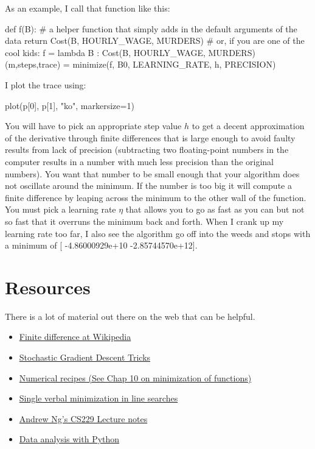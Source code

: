 \begin{fullwidth}
As an example, I call that function like this:

\begin{pyverbatim}
def f(B): # a helper function that simply adds in the default arguments of the data
    return Cost(B, HOURLY_WAGE, MURDERS)
# or, if you are one of the cool kids:
f = lambda B : Cost(B, HOURLY_WAGE, MURDERS)
(m,steps,trace) = minimize(f, B0, LEARNING_RATE, h, PRECISION)
\end{pyverbatim}

\noindent I plot the trace using:

\begin{pyverbatim}
plot(p[0], p[1], "ko", markersize=1)
\end{pyverbatim}

You will have to pick an appropriate step value $h$ to get a decent approximation of the derivative through finite differences that is large enough to avoid faulty results from lack of precision (subtracting two floating-point numbers in the computer results in a number with much less precision than the original numbers). You want that number to be small enough that your algorithm does not oscillate around the minimum. If the number is too big it will compute a finite difference by leaping across the minimum to the other wall of the function. You must pick a learning rate $\eta$ that allows you to go as fast as you can but not so fast that it overruns the minimum back and forth. When I crank up my learning rate too far, I also see the algorithm go off into the weeds and stops with a minimum of [ -4.86000929e+10  -2.85744570e+12].

\section{Resources}

There is a lot of material out there on the web that can be helpful.

\begin{itemize}
\item \href{http://en.wikipedia.org/wiki/Finite_difference}{Finite difference at Wikipedia}
\item \href{http://research.microsoft.com/pubs/192769/tricks-2012.pdf}{Stochastic Gradient Descent Tricks}
\item \href{http://apps.nrbook.com/fortran/index.html}{Numerical recipes (See Chap 10 on minimization of functions)}
\item \href{http://adl.stanford.edu/aa222/Lecture_Notes_files/AA222-Lecture2.pdf}{Single verbal minimization in line searches}
\item \href{http://cs229.stanford.edu/notes/cs229-notes1.pdf}{Andrew Ng's CS229 Lecture notes}
\item \href{http://people.duke.edu/~ccc14/pcfb/analysis.html}{Data analysis with Python}
\end{itemize}


\end{fullwidth}
